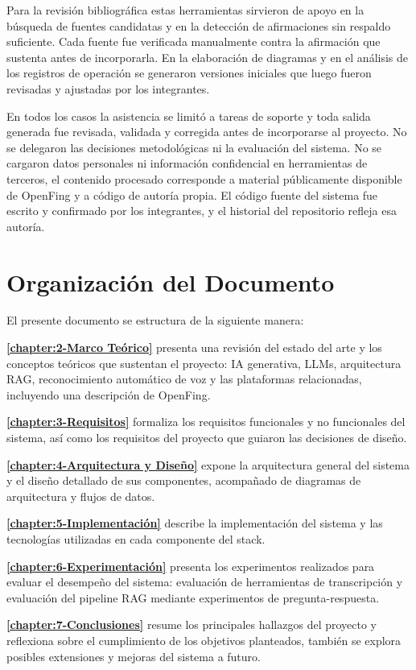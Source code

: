 Para la revisión bibliográfica estas herramientas sirvieron de apoyo en la búsqueda de fuentes candidatas y en la detección de afirmaciones sin respaldo suficiente. Cada fuente fue verificada manualmente contra la afirmación que sustenta antes de incorporarla. En la elaboración de diagramas y en el análisis de los registros de operación se generaron versiones iniciales que luego fueron revisadas y ajustadas por los integrantes.

En todos los casos la asistencia se limitó a tareas de soporte y toda salida generada fue revisada, validada y corregida antes de incorporarse al proyecto. No se delegaron las decisiones metodológicas ni la evaluación del sistema. No se cargaron datos personales ni información confidencial en herramientas de terceros, el contenido procesado corresponde a material públicamente disponible de OpenFing y a código de autoría propia. El código fuente del sistema fue escrito y confirmado por los integrantes, y el historial del repositorio refleja esa autoría.

\section{Organización del Documento}
\label{section:1-Organización del Documento}

El presente documento se estructura de la siguiente manera:

\textbf{\autoref{chapter:2-Marco Teórico}} presenta una revisión del estado del arte y los conceptos teóricos que sustentan el proyecto: IA generativa, LLMs, arquitectura RAG, reconocimiento automático de voz y las plataformas relacionadas, incluyendo una descripción de OpenFing.

\textbf{\autoref{chapter:3-Requisitos}} formaliza los requisitos funcionales y no funcionales del sistema, así como los requisitos del proyecto que guiaron las decisiones de diseño.

\textbf{\autoref{chapter:4-Arquitectura y Diseño}} expone la arquitectura general del sistema y el diseño detallado de sus componentes, acompañado de diagramas de arquitectura y flujos de datos.

\textbf{\autoref{chapter:5-Implementación}} describe la implementación del sistema y las tecnologías utilizadas en cada componente del stack.

\textbf{\autoref{chapter:6-Experimentación}} presenta los experimentos realizados para evaluar el desempeño del sistema: evaluación de herramientas de transcripción y evaluación del pipeline RAG mediante experimentos de pregunta-respuesta.

\textbf{\autoref{chapter:7-Conclusiones}} resume los principales hallazgos del proyecto y reflexiona sobre el cumplimiento de los objetivos planteados, también se explora posibles extensiones y mejoras del sistema a futuro.

